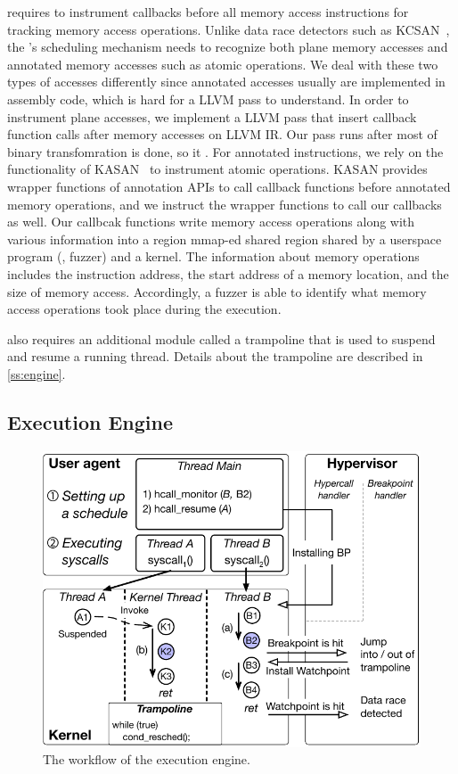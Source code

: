 \sys requires to instrument callbacks before all memory access
instructions for tracking memory access operations.
%
Unlike data race detectors such as KCSAN~\cite{kcsan}, the \sys's
scheduling mechanism needs to recognize both plane memory accesses and
annotated memory accesses such as atomic operations.
%
We deal with these two types of accesses differently since annotated
accesses usually are implemented in assembly code, which is hard for a
LLVM pass to understand.
%
In order to instrument plane accesses, we implement a LLVM pass that
insert callback function calls after memory accesses on LLVM IR.
%
Our pass runs after most of binary transfomration is done, so it
.
%
For annotated instructions, we rely on the functionality of
KASAN~\cite{kasan} to instrument atomic operations.
%
KASAN provides wrapper functions of annotation APIs to call callback
functions before annotated memory operations, and we instruct the
wrapper functions to call our callbacks as well.
%
Our callbcak functions write memory access operations along with
various information into a region mmap-ed shared region shared by a
userspace program (\ie, fuzzer) and a kernel. The information about
memory operations includes the instruction address, the start address
of a memory location, and the size of memory access.
%
Accordingly, a fuzzer is able to identify what memory access
operations took place during the execution.

\sys also requires an additional module called a trampoline that is
used to suspend and resume a running thread. Details about the
trampoline are described in \autoref{ss:engine}.


\subsection{Execution Engine}
\label{ss:engine}

\begin{figure}
  \includegraphics[width=0.9\linewidth]{fig/workflow-hypervisor.pdf}
  \caption{The workflow of the execution engine. }
  \label{fig:workflow-hypervisor}
\end{figure}

